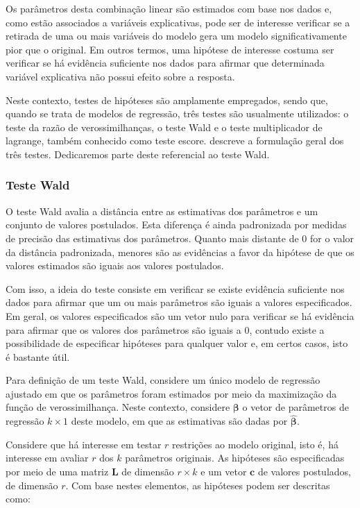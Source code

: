 Os parâmetros desta combinação linear são estimados com base nos dados e, como estão associados a variáveis explicativas, pode ser de interesse verificar se a retirada de uma ou mais variáveis do modelo gera um modelo significativamente pior que o original. Em outros termos, uma hipótese de interesse costuma ser verificar se há evidência suficiente nos dados para afirmar que determinada variável explicativa não possui efeito sobre a resposta.

Neste contexto, testes de hipóteses são amplamente empregados, sendo que, quando se trata de modelos de regressão, três testes são usualmente utilizados: o teste da razão de verossimilhanças, o teste Wald e o teste multiplicador de lagrange, também conhecido como teste escore. \citet{engle} descreve a formulação geral dos três testes. Dedicaremos parte deste referencial ao teste Wald.

\subsubsection{Teste Wald}

O teste Wald \citep{wald} avalia a distância entre as estimativas dos parâmetros e um conjunto de valores postulados. Esta diferença é ainda padronizada por medidas de precisão das estimativas dos parâmetros. Quanto mais distante de 0 for o valor da distância padronizada, menores são as evidências a favor da hipótese de que os valores estimados são iguais aos valores postulados.

Com isso, a ideia do teste consiste em verificar se existe evidência suficiente nos dados para afirmar que um ou mais parâmetros são iguais a valores especificados. Em geral, os valores especificados são um vetor nulo para verificar se há evidência para afirmar que os valores dos parâmetros são iguais a 0, contudo existe a possibilidade de especificar hipóteses para qualquer valor e, em certos casos, isto é bastante útil.

Para definição de um teste Wald, considere um único modelo de regressão ajustado em que os parâmetros foram estimados por meio da maximização da função de verossimilhança. Neste contexto, considere $\boldsymbol{\beta}$ o vetor de parâmetros de regressão $k \times 1$ deste modelo, em que as estimativas são dadas por $\boldsymbol{\hat\beta}$.

Considere que há interesse em testar $r$ restrições ao modelo original, isto é, há interesse em avaliar $r$ dos $k$ parâmetros originais. As hipóteses são especificadas por meio de uma matriz $\boldsymbol{L}$ de dimensão $r \times k$ e um vetor $\boldsymbol{c}$ de valores postulados, de dimensão $r$. Com base nestes elementos, as hipóteses podem ser descritas como:

